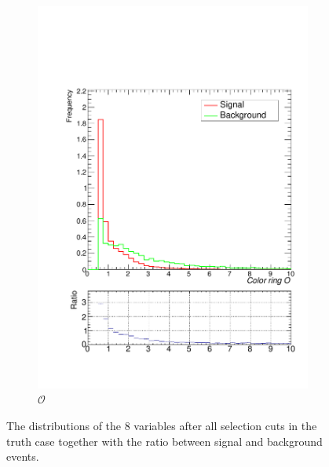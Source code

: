 \documentclass[10pt,a4paper]{book}
\begin{document}
\begin{figure}
\begin{subfigure}{.5\textwidth}
\includegraphics[scale=0.25]{truth/cr}
\caption{$\mathcal{O}$}
\end{subfigure}
\caption{The distributions of the 8 variables after all selection cuts in the truth case together with the ratio between signal and background events.}
\label{sgn/bkg true}
\end{figure}
\end{document}

